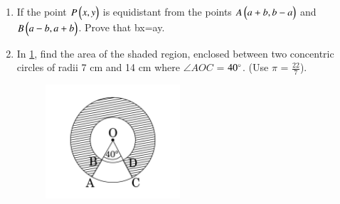 \documentclass[book,11pt,onecolumn]{IEEEtran}
\renewcommand\thesection{\arabic{section}}
\begin{document}
\begin{enumerate}[label=\thesection.\arabic*.,ref=\thesection.\theenumi]
\item  If the point $P\begin{pmatrix}x, y\end{pmatrix}$ is equidistant from the points $A\begin{pmatrix}a+b, b-a\end{pmatrix}$ and $B\begin{pmatrix}a-b, a+b\end{pmatrix}$. Prove that bx=ay.\\
   
\item  In \ref{figure_6}, find the area of the shaded region, enclosed between two concentric circles of radii 7 cm and 14 cm where $\angle AOC$ = $40\degree$. (Use $\pi$ = $\frac{22}{7}$).
	\begin{figure}[H]
      \centering
      \includegraphics[width=5cm]{figs/6.png}
      \caption{}
      \label{figure_6}
\end{figure} 


\end{enumerate}
\end{document}
